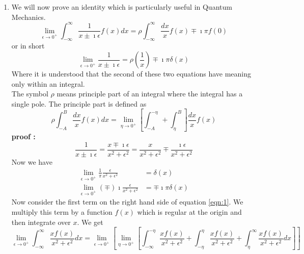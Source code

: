 \begin{enumerate}[label=\textbf{Note : \ \arabic*},start=1]
			
			\item
			We will now prove an identity which is particularly useful in Quantum Mechanics.
			\begin{equation}
				\lim\limits_{\epsilon \rightarrow 0^+} \int_{-\infty}^{\infty} \frac{1}{x \pm \imath \epsilon} f(x) dx = \rho \int_{-\infty}^{\infty} \frac{dx}{x}f(x) \mp \imath\pi f(0)
			\end{equation}
			or in short
			\begin{equation}
				\lim\limits_{\epsilon \rightarrow 0^+} \frac{1}{x \pm \imath \epsilon} = \rho(\frac{1}{x}) \mp \imath \pi \delta(x)
			\end{equation}
			Where it is understood that the second of these two equations have meaning only within an integral.\\
			The symbol $\rho$ means principle part of an integral where the integral has a single pole. The principle part is defined as
			\begin{equation}
				\rho \int_{-A}^{B} \frac{dx}{x} f(x) dx = \lim\limits_{\eta \rightarrow 0^+} \left[\int_{-A}^{-\eta} + \int_{\eta}^{B}\right] \frac{dx}{x} f(x)
			\end{equation}
			\textbf{proof :}
			\begin{equation}
				\frac{1}{x \pm \imath \epsilon} = \frac{x \mp \imath\epsilon}{x^2 + \epsilon^2} = \frac{x}{x^2 + \epsilon^2} \mp \frac{\imath \epsilon}{x^2 + \epsilon^2}
			\end{equation}
			Now we have
			\begin{eqnarray}\label{eqn:1}
				\lim\limits_{\epsilon \rightarrow 0^+} \frac{1}{\pi} \frac{\epsilon}{x^2 + \epsilon^2} &= \delta(x) \nonumber \\
				\lim\limits_{\epsilon \rightarrow 0^+} (\mp) \imath \frac{\epsilon}{x^2 + \epsilon^2} &= \mp \imath \pi \delta(x)
			\end{eqnarray}
			Now consider the first term on the right hand side of equation  \ref{eqn:1}. We multiply this term by a function $f(x)$ which is regular at the origin and then integrate over $x$. We get
			\begin{equation}\label{eqn:2}
				\lim\limits_{\epsilon \rightarrow 0^+} \int_{-\infty}^{\infty} \frac{x f(x)}{x^2 + \epsilon^2} dx
				=\lim\limits_{\epsilon \rightarrow 0^+}\left[
				\lim\limits_{\eta \rightarrow 0^+}\left[ \int_{-\infty}^{-\eta} \frac{x f(x)}{x^2 + \epsilon^2}
				+\int_{-\eta}^{\eta} \frac{x f(x)}{x^2 + \epsilon^2}
				+\int_{\eta}^{\infty} \frac{x f(x)}{x^2 + \epsilon^2} dx\right]\right]
			\end{equation}

\end{enumerate}
